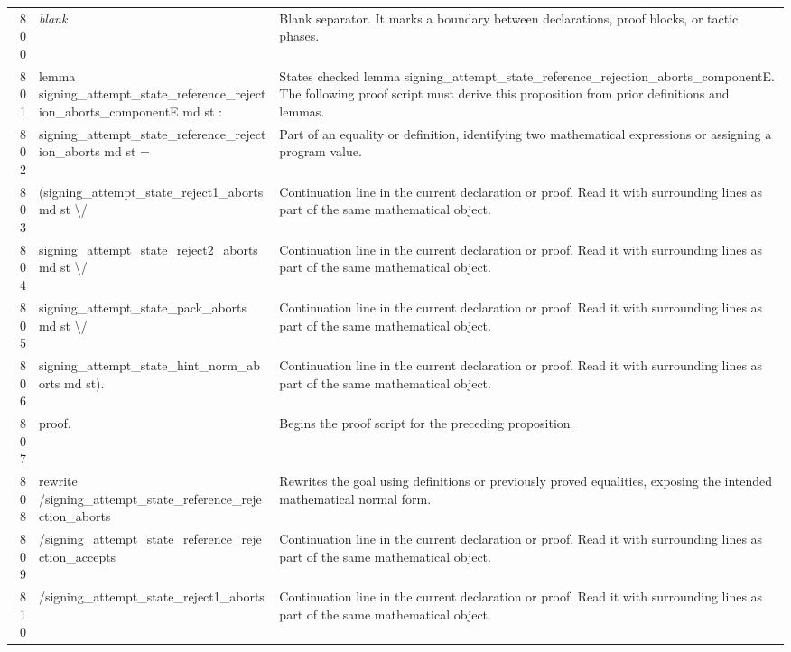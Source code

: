 \documentclass[10pt]{article}
\begin{document}
\begin{longtable}{r L{0.53\textwidth} L{0.37\textwidth}}
800 & {\ttfamily\scriptsize \emph{blank}} & Blank separator.  It marks a boundary between declarations, proof blocks, or tactic phases. \\
801 & {\ttfamily\scriptsize lemma signing\_attempt\_state\_reference\_rejection\_aborts\_componentE md st :} & States checked lemma signing\_attempt\_state\_reference\_rejection\_aborts\_componentE.  The following proof script must derive this proposition from prior definitions and lemmas. \\
802 & {\ttfamily\scriptsize   signing\_attempt\_state\_reference\_rejection\_aborts md st =} & Part of an equality or definition, identifying two mathematical expressions or assigning a program value. \\
803 & {\ttfamily\scriptsize   (signing\_attempt\_state\_reject1\_aborts md st \textbackslash{}/} & Continuation line in the current declaration or proof.  Read it with surrounding lines as part of the same mathematical object. \\
804 & {\ttfamily\scriptsize    signing\_attempt\_state\_reject2\_aborts md st \textbackslash{}/} & Continuation line in the current declaration or proof.  Read it with surrounding lines as part of the same mathematical object. \\
805 & {\ttfamily\scriptsize    signing\_attempt\_state\_pack\_aborts md st \textbackslash{}/} & Continuation line in the current declaration or proof.  Read it with surrounding lines as part of the same mathematical object. \\
806 & {\ttfamily\scriptsize    signing\_attempt\_state\_hint\_norm\_aborts md st).} & Continuation line in the current declaration or proof.  Read it with surrounding lines as part of the same mathematical object. \\
807 & {\ttfamily\scriptsize proof.} & Begins the proof script for the preceding proposition. \\
808 & {\ttfamily\scriptsize rewrite /signing\_attempt\_state\_reference\_rejection\_aborts} & Rewrites the goal using definitions or previously proved equalities, exposing the intended mathematical normal form. \\
809 & {\ttfamily\scriptsize         /signing\_attempt\_state\_reference\_rejection\_accepts} & Continuation line in the current declaration or proof.  Read it with surrounding lines as part of the same mathematical object. \\
810 & {\ttfamily\scriptsize         /signing\_attempt\_state\_reject1\_aborts} & Continuation line in the current declaration or proof.  Read it with surrounding lines as part of the same mathematical object. \\

\end{longtable}
\end{document}
